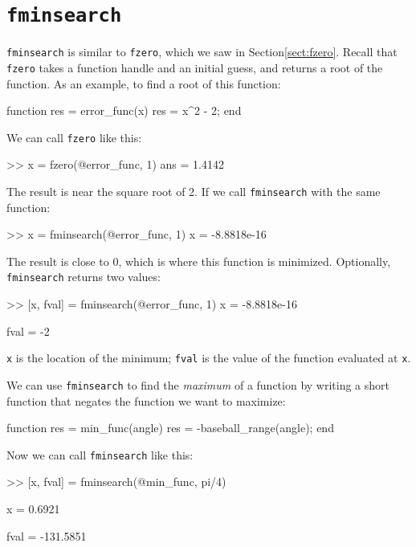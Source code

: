 \documentclass[
]{book}
\numberwithin{Answer}{chapter}
\numberwithin{Exercise}{chapter}
\begin{document}
\section{{\tt fminsearch}}

{\tt fminsearch} is similar to {\tt fzero}, which we saw in Section\ref{sect:fzero}.  Recall that {\tt fzero} takes a function handle and an initial guess, and returns a root of the function.
As an example, to find a root of this function:


\begin{code}
function res = error_func(x)
    res = x^2 - 2;
end
\end{code}

We can call {\tt fzero} like this:

\begin{code}
>> x = fzero(@error_func, 1)
ans = 1.4142
\end{code}

The result is near the square root of 2.  If we call {\tt fminsearch} with the same function:

\begin{code}
>> x = fminsearch(@error_func, 1)
x = -8.8818e-16
\end{code}

The result is close to 0, which is where this function is minimized.  Optionally, {\tt fminsearch} returns two values:

\begin{code}
>> [x, fval] = fminsearch(@error_func, 1)
x = -8.8818e-16

fval = -2
\end{code}

{\tt x} is the location of the minimum; {\tt fval} is the value of the function evaluated at {\tt x}.

We can use {\tt fminsearch} to find the {\em maximum} of a function by writing a short function that negates the function we want to maximize:

\begin{code}
function res = min_func(angle)
    res = -baseball_range(angle);
end
\end{code}

Now we can call {\tt fminsearch} like this:

\begin{code}
>> [x, fval] = fminsearch(@min_func, pi/4)

x = 0.6921

fval = -131.5851
\end{code}
\end{document}
